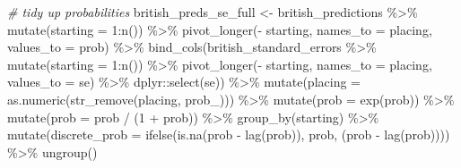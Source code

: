 \documentclass[
]{book}
\newenvironment{Shaded}{\begin{snugshade}}{\end{snugshade}}
\newcommand{\AttributeTok}[1]{\textcolor[rgb]{0.77,0.63,0.00}{#1}}
\newcommand{\CommentTok}[1]{\textcolor[rgb]{0.56,0.35,0.01}{\textit{#1}}}
\newcommand{\DecValTok}[1]{\textcolor[rgb]{0.00,0.00,0.81}{#1}}
\newcommand{\FunctionTok}[1]{\textcolor[rgb]{0.00,0.00,0.00}{#1}}
\newcommand{\NormalTok}[1]{#1}
\newcommand{\OtherTok}[1]{\textcolor[rgb]{0.56,0.35,0.01}{#1}}
\newcommand{\SpecialCharTok}[1]{\textcolor[rgb]{0.00,0.00,0.00}{#1}}
\newcommand{\StringTok}[1]{\textcolor[rgb]{0.31,0.60,0.02}{#1}}
\begin{document}
\begin{Shaded}
\begin{Highlighting}[]
\CommentTok{\# tidy up probabilities}
\NormalTok{british\_preds\_se\_full }\OtherTok{\textless{}{-}}\NormalTok{ british\_predictions }\SpecialCharTok{\%\textgreater{}\%}
  \FunctionTok{mutate}\NormalTok{(}\AttributeTok{starting =} \DecValTok{1}\SpecialCharTok{:}\FunctionTok{n}\NormalTok{()) }\SpecialCharTok{\%\textgreater{}\%}
  \FunctionTok{pivot\_longer}\NormalTok{(}\SpecialCharTok{{-}}\NormalTok{ starting, }\AttributeTok{names\_to =} \StringTok{\textquotesingle{}placing\textquotesingle{}}\NormalTok{, }\AttributeTok{values\_to =} \StringTok{\textquotesingle{}prob\textquotesingle{}}\NormalTok{) }\SpecialCharTok{\%\textgreater{}\%} 
  \FunctionTok{bind\_cols}\NormalTok{(british\_standard\_errors }\SpecialCharTok{\%\textgreater{}\%} \FunctionTok{mutate}\NormalTok{(}\AttributeTok{starting =} \DecValTok{1}\SpecialCharTok{:}\FunctionTok{n}\NormalTok{()) }\SpecialCharTok{\%\textgreater{}\%}
  \FunctionTok{pivot\_longer}\NormalTok{(}\SpecialCharTok{{-}}\NormalTok{ starting, }\AttributeTok{names\_to =} \StringTok{\textquotesingle{}placing\textquotesingle{}}\NormalTok{, }\AttributeTok{values\_to =} \StringTok{\textquotesingle{}se\textquotesingle{}}\NormalTok{) }\SpecialCharTok{\%\textgreater{}\%}
\NormalTok{    dplyr}\SpecialCharTok{::}\FunctionTok{select}\NormalTok{(se)) }\SpecialCharTok{\%\textgreater{}\%}
  \FunctionTok{mutate}\NormalTok{(}\AttributeTok{placing =} \FunctionTok{as.numeric}\NormalTok{(}\FunctionTok{str\_remove}\NormalTok{(placing, }\StringTok{\textquotesingle{}prob\_\textquotesingle{}}\NormalTok{))) }\SpecialCharTok{\%\textgreater{}\%}
  \FunctionTok{mutate}\NormalTok{(}\AttributeTok{prob =} \FunctionTok{exp}\NormalTok{(prob)) }\SpecialCharTok{\%\textgreater{}\%}
  \FunctionTok{mutate}\NormalTok{(}\AttributeTok{prob =}\NormalTok{ prob }\SpecialCharTok{/}\NormalTok{ (}\DecValTok{1} \SpecialCharTok{+}\NormalTok{ prob)) }\SpecialCharTok{\%\textgreater{}\%}
  \FunctionTok{group\_by}\NormalTok{(starting) }\SpecialCharTok{\%\textgreater{}\%} 
  \FunctionTok{mutate}\NormalTok{(}\AttributeTok{discrete\_prob =} \FunctionTok{ifelse}\NormalTok{(}\FunctionTok{is.na}\NormalTok{(prob }\SpecialCharTok{{-}} \FunctionTok{lag}\NormalTok{(prob)), prob, (prob }\SpecialCharTok{{-}} \FunctionTok{lag}\NormalTok{(prob)))) }\SpecialCharTok{\%\textgreater{}\%}
  \FunctionTok{ungroup}\NormalTok{()}


\end{Highlighting}
\end{Shaded}
\end{document}

